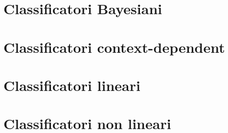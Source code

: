 \documentclass[italian, disablemarginnotes, allowcoloredmath]{../../../Resources/Utils/ClassNotes}
\begin{document}

\section{Classificatori Bayesiani}


\section{Classificatori context-dependent}


\section{Classificatori lineari}


\section{Classificatori non lineari}

\end{document}
